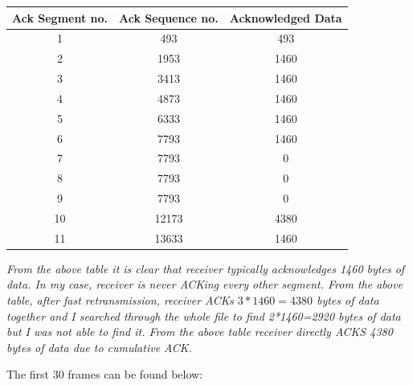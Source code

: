 \documentclass[11pt]{article}
\numberwithin{equation}{section}
\begin{document}
\begin{table}[H]
\begin{center}
    \begin{tabular}{|c|c|c|}
    \hline
    Ack Segment no. & Ack Sequence no. & Acknowledged Data\\ \hline
 
    1 & 493 & 493\\ \hline
    2 & 1953 & 1460  \\ \hline
    3 & 3413 & 1460\\ \hline
    4 & 4873 & 1460\\ \hline
    5 & 6333 & 1460 \\ \hline
    6 & 7793 & 1460\\ \hline
    7 & 7793 & 0\\ \hline  
    8 & 7793 & 0\\ \hline 
    9 & 7793 & 0\\ \hline
    10 & 12173 & 4380\\ \hline 
    11 & 13633 & 1460\\ \hline
    \end{tabular}
\end{center}
\end{table}

\textsl{ From the above table it is clear that receiver typically acknowledges 1460 bytes of data. In my case, receiver is never ACKing every other segment. From the above table, after fast retransmission, receiver ACKs $3*1460=4380$ bytes of data together and I searched through the whole file to find 2*1460=2920 bytes of data but I was not able to find it. From the above table receiver directly ACKS 4380 bytes of data due to cumulative ACK. }\newline

The first 30 frames can be found below:


\end{document}
